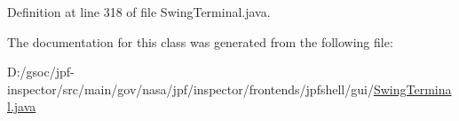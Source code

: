 Definition at line 318 of file Swing\+Terminal.\+java.



The documentation for this class was generated from the following file\+:\begin{DoxyCompactItemize}
\item 
D\+:/gsoc/jpf-\/inspector/src/main/gov/nasa/jpf/inspector/frontends/jpfshell/gui/\hyperlink{_swing_terminal_8java}{Swing\+Terminal.\+java}\end{DoxyCompactItemize}
